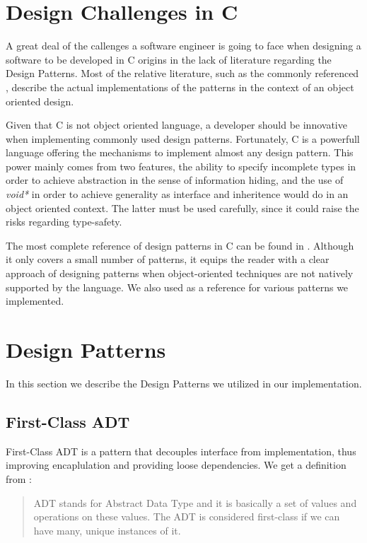 \section{Design Challenges in C}
A great deal of the callenges a software engineer is going to face when designing a software to be developed in C origins in the lack of literature regarding the Design Patterns. Most of the relative literature, such as the commonly referenced \cite{gofdesignpatterns}, describe the actual implementations of the patterns in the context of an object oriented design.

Given that C is not object oriented language, a developer should be innovative when implementing commonly used design patterns. Fortunately, C is a powerfull language offering the mechanisms to implement almost any design pattern. This power mainly comes from two features, the ability to specify incomplete types in order to achieve abstraction in the sense of information hiding, and the use of \textit{void*} in order to achieve generality as interface and inheritence would do in an object oriented context. The latter must be used carefully, since it could raise the risks regarding type-safety.

The most complete reference of design patterns in C can be found in \cite{patternsinc}. Although it only covers a small number of patterns, it equips the reader with a clear approach of designing patterns when object-oriented techniques are not natively supported by the language. We also used \cite{patternsinc} as a reference for various patterns we implemented.


\section{Design Patterns}
In this section we describe the Design Patterns we utilized in our implementation.

\subsection{First-Class ADT}
First-Class ADT is a pattern that decouples interface from implementation, thus improving encaplulation and providing loose dependencies. We get a definition from \cite{patternsinc}:
\begin{quote}
ADT stands for Abstract Data Type and it is basically a set of values and operations on these values. The ADT is considered first-class if we can have many, unique instances of it.
\end{quote}

